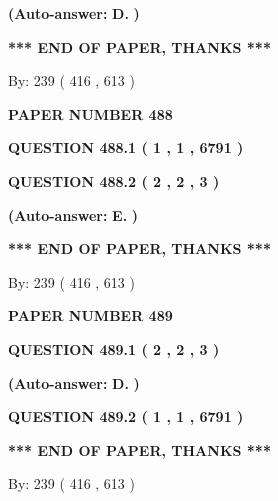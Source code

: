 \documentclass[12pt]{article}
\begin{document}
 
{\textbf{(Auto-answer:}}
{\textbf{\large{
D.}}}
{\textbf{)}}
 
 
   
   
   
   
\vspace{1.0in} 
{\textbf{\large{ *** END OF PAPER, THANKS *** }}} 
   
   
\hspace{1.0in} By: 
 239 ( 416 ,  613 )
   
   
   
   
\newpage 
\setcounter{page}{ 
   488001 } 
   
   
 {\textbf{ \Large{ PAPER NUMBER  488  }}}
   
   
   
   
  
  
{\textbf{\large{QUESTION
488.1 
 ( 1 , 1 , 6791 )
}}}
  
  
{\textbf{\large{QUESTION
488.2 
 ( 2 , 2 , 3 )
}}}
 
 
{\textbf{(Auto-answer:}}
{\textbf{\large{
E.}}}
{\textbf{)}}
 
 
   
   
   
   
\vspace{1.0in} 
{\textbf{\large{ *** END OF PAPER, THANKS *** }}} 
   
   
\hspace{1.0in} By: 
 239 ( 416 ,  613 )
   
   
   
   
\newpage 
\setcounter{page}{ 
   489001 } 
   
   
 {\textbf{ \Large{ PAPER NUMBER  489  }}}
   
   
   
   
  
  
{\textbf{\large{QUESTION
489.1 
 ( 2 , 2 , 3 )
}}}
 
 
{\textbf{(Auto-answer:}}
{\textbf{\large{
D.}}}
{\textbf{)}}
 
 
  
  
{\textbf{\large{QUESTION
489.2 
 ( 1 , 1 , 6791 )
}}}
   
   
   
   
\vspace{1.0in} 
{\textbf{\large{ *** END OF PAPER, THANKS *** }}} 
   
   
\hspace{1.0in} By: 
 239 ( 416 ,  613 )
   
   
   
   
\newpage 
\setcounter{page}{ 
   490001 } 
   
\end{document}
